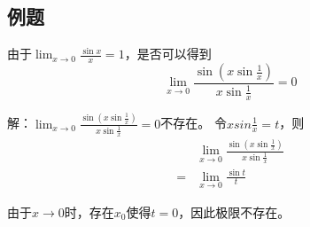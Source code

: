 \documentclass[UTF8]{ctexart}
\begin{document}
	\subsection{例题}
		由于$\lim_{x\rightarrow 0} \frac{\sin x}{x}=1$，是否可以得到
		$$
		\lim _{x\rightarrow 0}
		\frac{\sin(x\sin {\frac{1}{x}})}
		{x\sin{\frac{1}{x}}}=0
		$$
		
		解：$
		\lim _{x\rightarrow 0}
		\frac{\sin(x\sin {\frac{1}{x}})}
		{x\sin{\frac{1}{x}}}=0
		$不存在。	
		令$xsin \frac{1}{x}=t$，则
		\begin{equation}
			\begin{split}
				&\lim _{x\rightarrow 0}
				\frac{\sin(x\sin {\frac{1}{x}})}
				{x\sin{\frac{1}{x}}}\\
				=&\lim _{x\rightarrow 0}
				\frac{\sin t}{t}
			\end{split}
		\end{equation}

	由于$x\rightarrow 0$时，存在$x_0$使得$t=0$，因此极限不存在。
	
\end{document}
